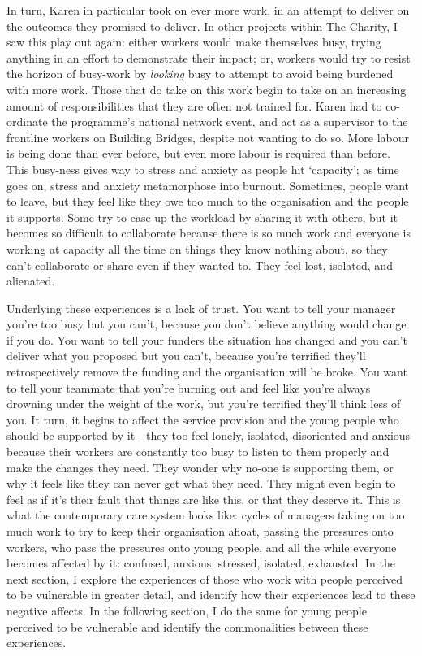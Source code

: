 In turn, Karen in particular took on ever more work, in an attempt to deliver on the outcomes they promised to deliver. In other projects within The Charity, I saw this play out again: either workers would make themselves busy, trying anything in an effort to demonstrate their impact; or, workers would try to resist the horizon of busy-work by \emph{looking} busy to attempt to avoid being burdened with more work. Those that do take on this work begin to take on an increasing amount of responsibilities that they are often not trained for. Karen had to co-ordinate the programme’s national network event, and act as a supervisor to the frontline workers on Building Bridges, despite not wanting to do so. More labour is being done than ever before, but even more labour is required than before. This busy-ness gives way to stress and anxiety as people hit `capacity'; as time goes on, stress and anxiety metamorphose into burnout. Sometimes, people want to leave, but they feel like they owe too much to the organisation and the people it supports. Some try to ease up the workload by sharing it with others, but it becomes so difficult to collaborate because there is so much work and everyone is working at capacity all the time on things they know nothing about, so they can’t collaborate or share even if they wanted to. They feel lost, isolated, and alienated.

Underlying these experiences is a lack of trust. You want to tell your manager you’re too busy but you can’t, because you don’t believe anything would change if you do. You want to tell your funders the situation has changed and you can’t deliver what you proposed but you can’t, because you’re terrified they’ll retrospectively remove the funding and the organisation will be broke. You want to tell your teammate that you’re burning out and feel like you’re always drowning under the weight of the work, but you’re terrified they’ll think less of you. It turn, it begins to affect the service provision and the young people who should be supported by it - they too feel lonely, isolated, disoriented and anxious because their workers are constantly too busy to listen to them properly and make the changes they need. They wonder why no-one is supporting them, or why it feels like they can never get what they need. They might even begin to feel as if it’s their fault that things are like this, or that they deserve it. This is what the contemporary care system looks like: cycles of managers taking on too much work to try to keep their organisation afloat, passing the pressures onto workers, who pass the pressures onto young people, and all the while everyone becomes affected by it: confused, anxious, stressed, isolated, exhausted. In the next section, I explore the experiences of those who work with people perceived to be vulnerable in greater detail, and identify how their experiences lead to these negative affects. In the following section, I do the same for young people perceived to be vulnerable and identify the commonalities between these experiences. 


